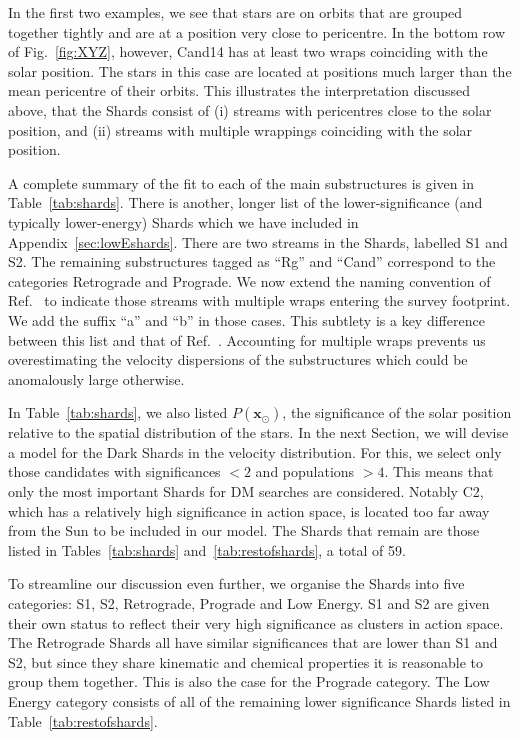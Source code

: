 \documentclass[prd,10pt,twocolumn,showpacs,nofootinbib,aps,superscriptaddress,preprintnumbers]{revtex4-1}
\begin{document}
 In the first two examples, we see that stars are on
 orbits that are grouped together tightly and are at a position very
 close to pericentre. In the bottom row of
 Fig.~\ref{fig:XYZ}, however, Cand14 has at least two wraps coinciding with
 the solar position. The stars in this case
 are located at positions much larger than the mean pericentre of their
 orbits. This illustrates the interpretation discussed above, that the
 Shards consist of (i) streams with pericentres close to the solar
 position, and (ii) streams with multiple wrappings coinciding with the
 solar position. 

 A complete summary of the fit to each of the main substructures is
 given in Table~\ref{tab:shards}. There is another, longer list of the
 lower-significance (and typically lower-energy) Shards which we have
 included in Appendix~\ref{sec:lowEshards}. There are two streams in
 the Shards, labelled S1 and S2. The remaining substructures tagged as ``Rg''
 and ``Cand'' correspond to the categories Retrograde and Prograde. We
 now extend the naming convention of Ref.~\cite{Myeong:Preprint} to
 indicate those streams with multiple wraps entering the survey
 footprint. We add the suffix ``a'' and ``b'' in
 those cases. This subtlety is a key difference between this list and
 that of Ref.~\cite{Myeong:Preprint}. Accounting for multiple wraps
 prevents us overestimating the velocity dispersions of the substructures
 which could be anomalously large otherwise.

 In Table~\ref{tab:shards}, we also listed $P(\mathbf{x}_\odot)$, the
 significance of the solar position relative to the spatial
 distribution of the stars. In the next Section, we will devise a model for the Dark Shards in the
 velocity distribution. For this, we select only those candidates with
 significances $<2$ and populations $>4$. This means that only the
 most important Shards for DM searches are considered.  
Notably C2, which has a relatively high significance in action space, is located too far away from the Sun to be included in our model. 
 The Shards that remain are those listed in Tables~\ref{tab:shards}
 and~\ref{tab:restofshards}, a total of 59.

To streamline our discussion even further, we organise the Shards into five categories: S1, S2, Retrograde,
 Prograde and Low Energy. S1 and S2 are given their own status to
 reflect their very high significance as clusters in action space. The
 Retrograde Shards all have similar significances that are lower than
 S1 and S2, but since they share kinematic and chemical properties it
 is reasonable to group them together. This is also the case for the
 Prograde category. The Low Energy category consists of all of the
 remaining lower significance Shards listed in Table~\ref{tab:restofshards}.
\end{document}
